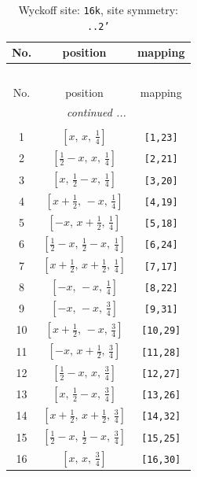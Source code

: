 \documentclass[fleqn,8pt]{jsarticle}
\begin{document}
\renewcommand{\arraystretch}{1.2}
\begin{longtable}{ccc}
\caption{Wyckoff site: {\tt 16k}, site symmetry: {\tt ..2'}}
 \\
 \hline \hline
No. & position & mapping \\ \hline \endfirsthead

\multicolumn{2}{l}{\tablename\ \thetable{}} \\
 \hline \hline
No. & position & mapping \\ \hline \endhead

 \hline \hline
\multicolumn{2}{r}{\footnotesize\it continued ...} \\ \endfoot

 \hline \hline
\multicolumn{2}{r}{} \\ \endlastfoot

1 & $\left[ x,\, x,\, \frac{1}{4} \right]$ & {\tt [1,23]} \\ \hline
2 & $\left[ \frac{1}{2} - x,\, x,\, \frac{1}{4} \right]$ & {\tt [2,21]} \\ \hline
3 & $\left[ x,\, \frac{1}{2} - x,\, \frac{1}{4} \right]$ & {\tt [3,20]} \\ \hline
4 & $\left[ x + \frac{1}{2},\, - x,\, \frac{1}{4} \right]$ & {\tt [4,19]} \\ \hline
5 & $\left[ - x,\, x + \frac{1}{2},\, \frac{1}{4} \right]$ & {\tt [5,18]} \\ \hline
6 & $\left[ \frac{1}{2} - x,\, \frac{1}{2} - x,\, \frac{1}{4} \right]$ & {\tt [6,24]} \\ \hline
7 & $\left[ x + \frac{1}{2},\, x + \frac{1}{2},\, \frac{1}{4} \right]$ & {\tt [7,17]} \\ \hline
8 & $\left[ - x,\, - x,\, \frac{1}{4} \right]$ & {\tt [8,22]} \\ \hline
9 & $\left[ - x,\, - x,\, \frac{3}{4} \right]$ & {\tt [9,31]} \\ \hline
10 & $\left[ x + \frac{1}{2},\, - x,\, \frac{3}{4} \right]$ & {\tt [10,29]} \\ \hline
11 & $\left[ - x,\, x + \frac{1}{2},\, \frac{3}{4} \right]$ & {\tt [11,28]} \\ \hline
12 & $\left[ \frac{1}{2} - x,\, x,\, \frac{3}{4} \right]$ & {\tt [12,27]} \\ \hline
13 & $\left[ x,\, \frac{1}{2} - x,\, \frac{3}{4} \right]$ & {\tt [13,26]} \\ \hline
14 & $\left[ x + \frac{1}{2},\, x + \frac{1}{2},\, \frac{3}{4} \right]$ & {\tt [14,32]} \\ \hline
15 & $\left[ \frac{1}{2} - x,\, \frac{1}{2} - x,\, \frac{3}{4} \right]$ & {\tt [15,25]} \\ \hline
16 & $\left[ x,\, x,\, \frac{3}{4} \right]$ & {\tt [16,30]} \\
\end{longtable}
\end{document}
